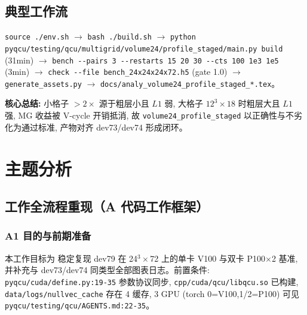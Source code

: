 \documentclass[UTF8]{ctexart}
\begin{document}
\subsection{典型工作流}
\texttt{\nolinkurl{source ./env.sh}} $\to$ \texttt{\nolinkurl{bash ./build.sh}} $\to$ \texttt{\nolinkurl{python pyqcu/testing/qcu/multigrid/volume24/profile_staged/main.py build}} (31min) $\to$ \texttt{\nolinkurl{bench --pairs 3 --restarts 15 20 30 --cts 100 1e3 1e5}} (3min) $\to$ \texttt{\nolinkurl{check --file bench_24x24x24x72.h5}} (gate 1.0) $\to$ \texttt{\nolinkurl{generate_assets.py}} $\to$ \texttt{\nolinkurl{docs/analy_volume24_profile_staged_*.tex}}。

\begin{ideabox}
\textbf{核心总结:} 小格子 $>2\times$ 源于粗层小且 $L1$ 弱, 大格子 $12^3\times18$ 时粗层大且 $L1$ 强, MG 收益被 V-cycle 开销抵消, 故 \texttt{\nolinkurl{volume24_profile_staged}} 以正确性与不劣化为通过标准, 产物对齐 dev73/dev74 形成闭环。
\end{ideabox}

\section{主题分析}
\subsection{工作全流程重现（A 代码工作框架）}

\subsubsection{A1 目的与前期准备}
本工作目标为 \textcolor{struct}{稳定复现 dev79 在 24$^3\times$72 上的单卡 V100 与双卡 P100$\times$2 基准, 并补充与 dev73/dev74 同类型全部图表日志}。前置条件: \texttt{\nolinkurl{pyqcu/cuda/define.py:19-35}} 参数协议同步, \texttt{\nolinkurl{cpp/cuda/qcu/libqcu.so}} 已构建, \texttt{\nolinkurl{data/logs/nullvec_cache}} 存在 4 缓存, 3 GPU (torch 0=V100,1/2=P100) 可见 \textcolor{evidence}{\texttt{\nolinkurl{pyqcu/testing/qcu/AGENTS.md:22-35}}}。
\end{document}
